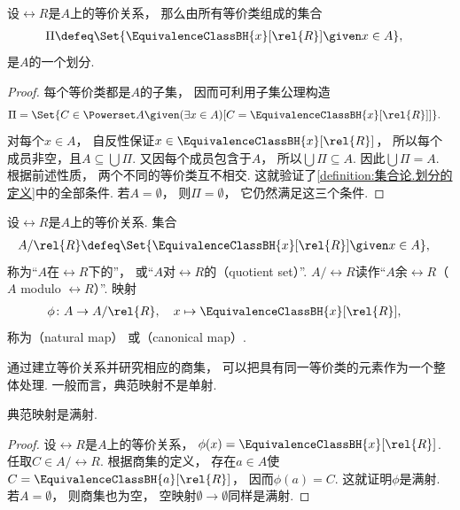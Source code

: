 \begin{theorem}
    设\(\rel{R}\)是\(A\)上的等价关系，
    那么由所有等价类组成的集合
    \begin{align*}
        \Pi&\defeq\Set{\EquivalenceClassBH{x}[\rel{R}]\given x\in A},
    \end{align*}
    是\(A\)的一个划分.
    \begin{proof}
        每个等价类都是\(A\)的子集，
        因而可利用子集公理构造
        \begin{align*}
            \Pi&=\Set{C\in\Powerset A\given
            (\exists x\in A)[C=\EquivalenceClassBH{x}[\rel{R}]]}.
        \end{align*}
        对每个\(x\in A\)，
        自反性保证\(x\in\EquivalenceClassBH{x}[\rel{R}]\)，
        所以每个成员非空，且\(A\subseteq\bigcup\Pi\).
        又因每个成员包含于\(A\)，
        所以\(\bigcup\Pi\subseteq A\).
        因此\(\bigcup\Pi=A\).
        根据前述性质，
        两个不同的等价类互不相交.
        这就验证了\cref{definition:集合论.划分的定义}中的全部条件.
        若\(A=\emptyset\)，
        则\(\Pi=\emptyset\)，
        它仍然满足这三个条件.
    \end{proof}
\end{theorem}

\begin{definition}\label{definition:集合论.商集的定义}
    设\(\rel{R}\)是\(A\)上的等价关系.
    集合
    \begin{align*}
        A/\rel{R}&\defeq\Set{\EquivalenceClassBH{x}[\rel{R}]\given x\in A},
    \end{align*}
    称为“\(A\)在\(\rel{R}\)下的”，
    或“\(A\)对\(\rel{R}\)的（quotient set）”.
    \(A/\rel{R}\)读作“\(A\)余\(\rel{R}\)（\(A\) modulo \(\rel{R}\)）”.
    映射
    \begin{align*}
        \phi\colon A\to A/\rel{R},\quad
        x&\mapsto\EquivalenceClassBH{x}[\rel{R}],
    \end{align*}
    称为（natural map）
    或（canonical map）.
\end{definition}
通过建立等价关系并研究相应的商集，
可以把具有同一等价类的元素作为一个整体处理.
一般而言，典范映射不是单射.

\begin{proposition}\label{theorem:集合论.典范映射是满射}
    典范映射是满射.
    \begin{proof}
        设\(\rel{R}\)是\(A\)上的等价关系，
        \(\phi(x)=\EquivalenceClassBH{x}[\rel{R}]\).
        任取\(C\in A/\rel{R}\).
        根据商集的定义，
        存在\(a\in A\)使\(C=\EquivalenceClassBH{a}[\rel{R}]\)，
        因而\(\phi(a)=C\).
        这就证明\(\phi\)是满射.
        若\(A=\emptyset\)，
        则商集也为空，
        空映射\(\emptyset\to\emptyset\)同样是满射.
    \end{proof}
\end{proposition}

